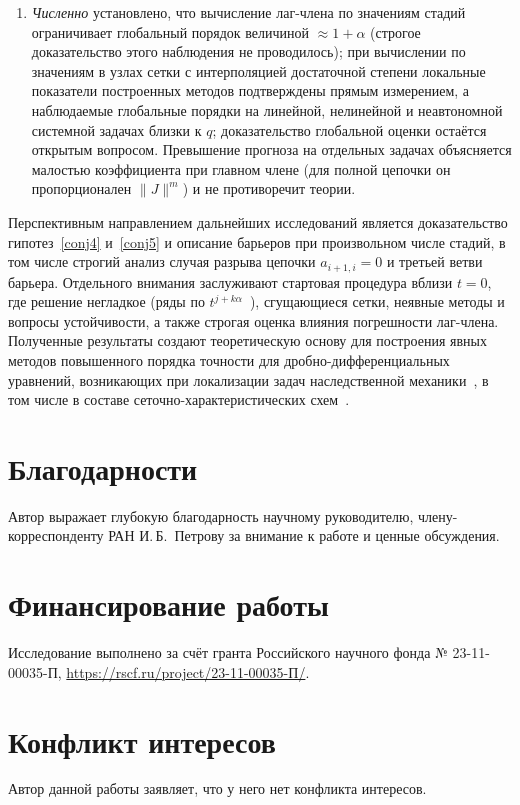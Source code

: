 \documentclass[11pt,a4paper]{article}
\theoremstyle{plain}
\theoremstyle{definition}
\begin{document}
\begin{enumerate}
\item \emph{Численно} установлено, что вычисление лаг-члена по значениям стадий ограничивает глобальный порядок величиной $\approx1+\alpha$ (строгое доказательство этого наблюдения не проводилось); при вычислении по значениям в узлах сетки с интерполяцией достаточной степени локальные показатели построенных методов подтверждены прямым измерением, а наблюдаемые глобальные порядки на линейной, нелинейной и неавтономной системной задачах близки к $q$; доказательство глобальной оценки остаётся открытым вопросом. Превышение прогноза на отдельных задачах объясняется малостью коэффициента при главном члене (для полной цепочки он пропорционален $\|J\|^m$) и не противоречит теории.
\end{enumerate}

Перспективным направлением дальнейших исследований является доказательство гипотез~\ref{conj4} и~\ref{conj5} и описание барьеров при произвольном числе стадий, в том числе строгий анализ случая разрыва цепочки $a_{i+1,i}=0$ и третьей ветви барьера. Отдельного внимания заслуживают стартовая процедура вблизи $t=0$, где решение негладкое (ряды по $t^{j+k\alpha}$~\cite{Lubich1983}), сгущающиеся сетки, неявные методы и вопросы устойчивости, а также строгая оценка влияния погрешности лаг-члена. Полученные результаты создают теоретическую основу для построения явных методов повышенного порядка точности для дробно-дифференциальных уравнений, возникающих при локализации задач наследственной механики~\cite{PPKh2024}, в том числе в составе сеточно-характеристических схем~\cite{PP2026zhvm}.

\section*{Благодарности}
Автор выражает глубокую благодарность научному руководителю, члену-корреспонденту РАН И.\,Б.~Петрову за внимание к работе и ценные обсуждения.

\section*{Финансирование работы}
Исследование выполнено за счёт гранта Российского научного фонда № 23-11-00035-П, \url{https://rscf.ru/project/23-11-00035-П/}.

\section*{Конфликт интересов}
Автор данной работы заявляет, что у него нет конфликта интересов.
\end{document}
